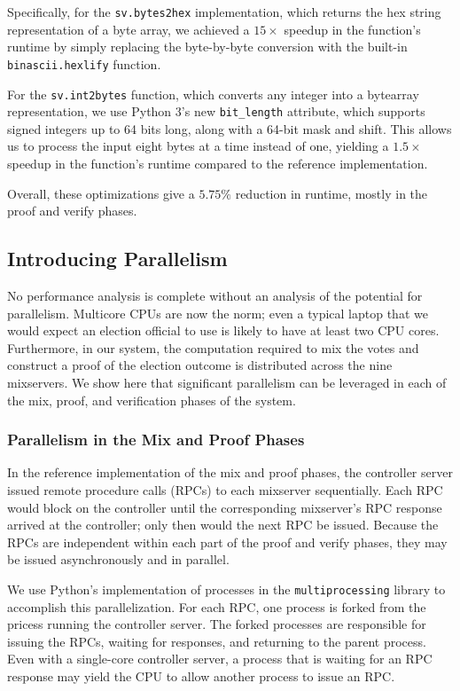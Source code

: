 Specifically, for the \texttt{sv.bytes2hex} implementation, which returns the hex string representation of a byte array, we achieved a $15 \times$ speedup in the function's runtime by simply replacing the byte-by-byte conversion with the built-in \texttt{binascii.hexlify} function.

For the \texttt{sv.int2bytes} function, which converts any integer into a bytearray representation, we use Python 3's new \texttt{bit\_length} attribute, which supports signed integers up to 64 bits long, along with a 64-bit mask and shift. This allows us to process the input eight bytes at a time instead of one, yielding a $1.5 \times$ speedup in the function's runtime compared to the reference implementation.

Overall, these optimizations give a $5.75\%$ reduction in runtime, mostly in the proof and verify phases.

\subsection{Introducing Parallelism} \label{perf:optimizations:parallel}

No performance analysis is complete without an analysis of the potential for parallelism. Multicore CPUs are now the norm; even a typical laptop that we would expect an election official to use is likely to have at least two CPU cores. Furthermore, in our system, the computation required to mix the votes and construct a proof of the election outcome is distributed across the nine mixservers. We show here that significant parallelism can be leveraged in each of the mix, proof, and verification phases of the system.

\subsubsection{Parallelism in the Mix and Proof Phases}

In the reference implementation of the mix and proof phases, the controller server issued remote procedure calls (RPCs) to each mixserver sequentially. Each RPC would block on the controller until the corresponding mixserver's RPC response arrived at the controller; only then would the next RPC be issued. Because the RPCs are independent within each part of the proof and verify phases, they may be issued asynchronously and in parallel.

We use Python's implementation of processes in the \texttt{multiprocessing} library to accomplish this parallelization. For each RPC, one process is forked from the pricess running the controller server. The forked processes are responsible for issuing the RPCs, waiting for responses, and returning to the parent process. Even with a single-core controller server, a process that is waiting for an RPC response may yield the CPU to allow another process to issue an RPC.

